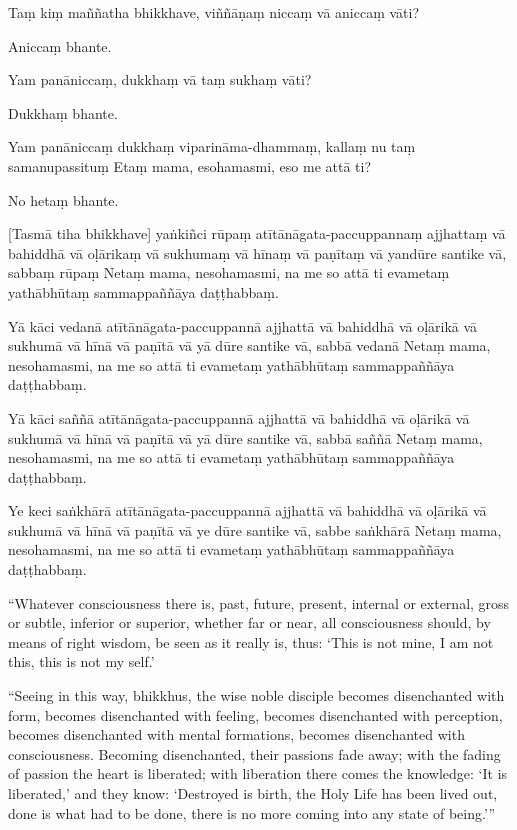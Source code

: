 \paliText

Taṃ kiṃ maññatha bhikkhave, viññāṇaṃ niccaṃ vā aniccaṃ vāti?

Aniccaṃ bhante.

Yam panāniccaṃ, dukkhaṃ vā taṃ sukhaṃ vāti?

Dukkhaṃ bhante.

Yam panāniccaṃ dukkhaṃ viparināma-dhammaṃ, kallaṃ nu taṃ samanupassituṃ
Etaṃ mama, esohamasmi, eso me attā ti?

No hetaṃ bhante.

[Tasmā tiha bhikkhave] yaṅkiñci rūpaṃ atītānāgata-paccuppannaṃ ajjhattaṃ
vā bahiddhā vā oḷārikaṃ vā sukhumaṃ vā hīnaṃ vā paṇītaṃ vā yandūre
santike vā, sabbaṃ rūpaṃ Netaṃ mama, nesohamasmi, na me so attā ti
evametaṃ yathābhūtaṃ sammappaññāya daṭṭhabbaṃ.

Yā kāci vedanā atītānāgata-paccuppannā ajjhattā vā bahiddhā vā oḷārikā
vā sukhumā vā hīnā vā paṇītā vā yā dūre santike vā, sabbā vedanā Netaṃ
mama, nesohamasmi, na me so attā ti evametaṃ yathābhūtaṃ sammappaññāya
daṭṭhabbaṃ.

Yā kāci saññā atītānāgata-paccuppannā ajjhattā vā bahiddhā vā oḷārikā vā
sukhumā vā hīnā vā paṇītā vā yā dūre santike vā, sabbā saññā Netaṃ mama,
nesohamasmi, na me so attā ti evametaṃ yathābhūtaṃ sammappaññāya
daṭṭhabbaṃ.

Ye keci saṅkhārā atītānāgata-paccuppannā ajjhattā vā bahiddhā vā oḷārikā
vā sukhumā vā hīnā vā paṇītā vā ye dūre santike vā, sabbe saṅkhārā Netaṃ
mama, nesohamasmi, na me so attā ti evametaṃ yathābhūtaṃ sammappaññāya
daṭṭhabbaṃ.

\clearpage

\englishText

``Whatever consciousness there is, past, future, present, internal or
external, gross or subtle, inferior or superior, whether far or near,
all consciousness should, by means of right wisdom, be seen as it really
is, thus: `This is not mine, I am not this, this is not my self.'

``Seeing in this way, bhikkhus, the wise noble disciple becomes
disenchanted with form, becomes disenchanted with feeling, becomes
disenchanted with perception, becomes disenchanted with mental
formations, becomes disenchanted with consciousness. Becoming
disenchanted, their passions fade away; with the fading of passion the
heart is liberated; with liberation there comes the knowledge: `It is
liberated,' and they know: `Destroyed is birth, the Holy Life has been
lived out, done is what had to be done, there is no more coming into any
state of being.'\thinspace ''

